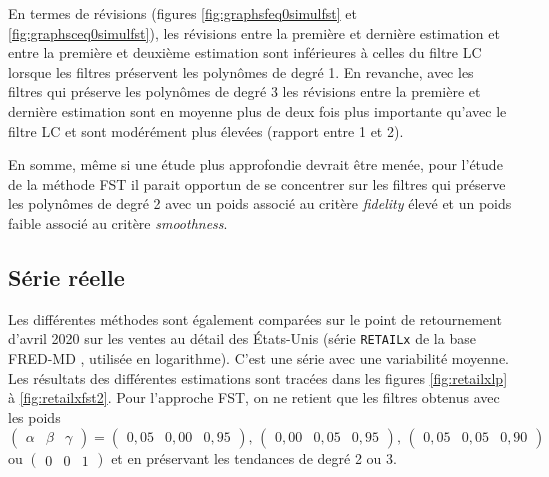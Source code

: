 \documentclass[
  12pt,
  a4paper,french]{article}
\newcommand\1{\mathds{1}}
\begin{document}
En termes de révisions (figures \ref{fig:graphsfeq0simulfst} et \ref{fig:graphsceq0simulfst}), les révisions entre la première et dernière estimation et entre la première et deuxième estimation sont inférieures à celles du filtre LC lorsque les filtres préservent les polynômes de degré 1. En revanche, avec les filtres qui préserve les polynômes de degré 3 les révisions entre la première et dernière estimation sont en moyenne plus de deux fois plus importante qu'avec le filtre LC et sont modérément plus élevées (rapport entre 1 et 2).

En somme, même si une étude plus approfondie devrait être menée, pour l'étude de la méthode FST il parait opportun de se concentrer sur les filtres qui préserve les polynômes de degré 2 avec un poids associé au critère \emph{fidelity} élevé et un poids faible associé au critère \emph{smoothness}.

\hypertarget{suxe9rie-ruxe9elle}{%
\subsection{Série réelle}\label{suxe9rie-ruxe9elle}}

Les différentes méthodes sont également comparées sur le point de retournement d'avril 2020 sur les ventes au détail des États-Unis (série \texttt{RETAILx} de la base FRED-MD \textcite{fredmd}, utilisée en logarithme).
C'est une série avec une variabilité moyenne.
Les résultats des différentes estimations sont tracées dans les figures \ref{fig:retailxlp} à \ref{fig:retailxfst2}.
Pour l'approche FST, on ne retient que les filtres obtenus avec les poids \(\begin{pmatrix}\alpha&\beta&\gamma\end{pmatrix} = \begin{pmatrix}0,05 &0,00&0,95\end{pmatrix},\, \begin{pmatrix}0,00 &0,05&0,95\end{pmatrix},\, \begin{pmatrix}0,05 &0,05&0,90\end{pmatrix}\) ou \(\begin{pmatrix}0 &0&1\end{pmatrix}\) et en préservant les tendances de degré 2 ou 3.
\end{document}
